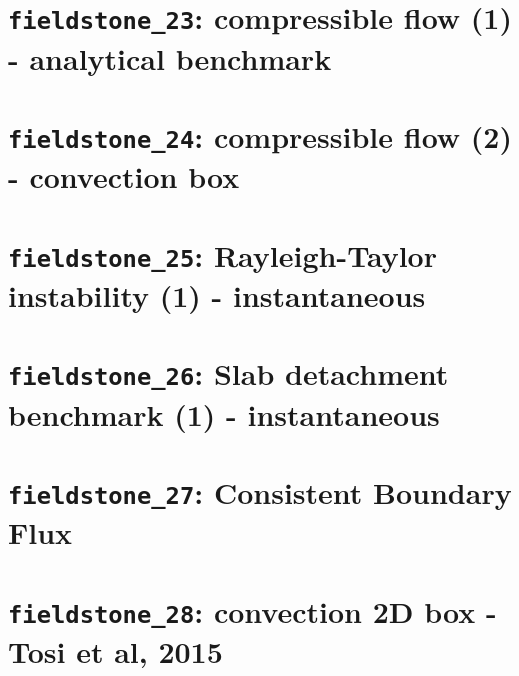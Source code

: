 \documentclass[a4paper]{article}
\begin{document}
\section{{\tt fieldstone\_23}: compressible flow (1) - analytical benchmark \label{f23}}


\newpage
\section{{\tt fieldstone\_24}: compressible flow (2) - convection box \label{f24}}


\newpage %
\section{{\tt fieldstone\_25}: Rayleigh-Taylor instability (1) - instantaneous \label{f25}}

\newpage %
\section{{\tt fieldstone\_26}: Slab detachment benchmark (1) - instantaneous \label{f26}}

\newpage %
\section{{\tt fieldstone\_27}: Consistent Boundary Flux \label{f27}} %

\newpage %
\section{{\tt fieldstone\_28}: convection 2D box - Tosi et al, 2015 \label{f28}} %
\end{document}
